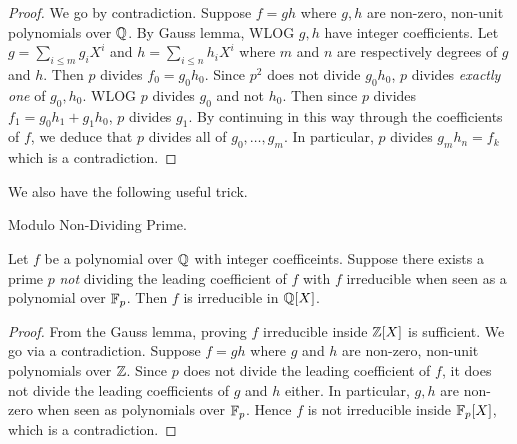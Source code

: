 \documentclass[../book.tex]{subfiles}
\begin{document}
\begin{proof}
    
    We go by contradiction. 
    Suppose $f = gh$ where $g, h$ are non-zero, non-unit polynomials over $\mathbb{Q}$. 
    By Gauss lemma, WLOG $g, h$ have integer coefficients. 
    Let $g = \sum_{i \leq m} g_i X^i$ and $h = \sum_{i \leq n} h_i X^i$
    where $m$ and $n$ are respectively degrees of $g$ and $h$. 
    Then $p$ divides $f_0 = g_0 h_0$. 
    Since $p^2$ does not divide $g_0 h_0$, 
    $p$ divides \emph{exactly one} of $g_0, h_0$.
    WLOG $p$ divides $g_0$ and not $h_0$. 
    Then since $p$ divides $f_1 = g_0 h_1 + g_1 h_0$, $p$ divides $g_1$.
    By continuing in this way through the coefficients of $f$,
    we deduce that $p$ divides all of $g_0, \dots, g_m$. 
    In particular, $p$ divides $g_m h_n = f_k$ which is a contradiction. 
    
\end{proof}

We also have the following useful trick. 

\begin{thm} Modulo Non-Dividing Prime. 
    
    Let $f$ be a polynomial over $\mathbb{Q}$ with integer coefficeints. 
    Suppose there exists a prime $p$ 
    \emph{not} dividing the leading coefficient of $f$
    with $f$ irreducible when seen as a polynomial over $\mathbb{F}_p$. 
    Then $f$ is irreducible in $\mathbb{Q}[X]$. 
    
\end{thm}
\begin{proof}
    
    From the Gauss lemma, proving $f$ irreducible inside $\mathbb{Z}[X]$ is sufficient. 
    We go via a contradiction. 
    Suppose $f = gh$ where $g$ and $h$ are non-zero, non-unit polynomials over $\mathbb{Z}$. 
    Since $p$ does not divide the leading coefficient of $f$,
    it does not divide the leading coefficients of $g$ and $h$ either. 
    In particular, $g, h$ are non-zero when seen as polynomials over $\mathbb{F}_p$. 
    Hence $f$ is not irreducible inside $\mathbb{F}_p[X]$, which is a contradiction. 
    
\end{proof}

\end{document}
